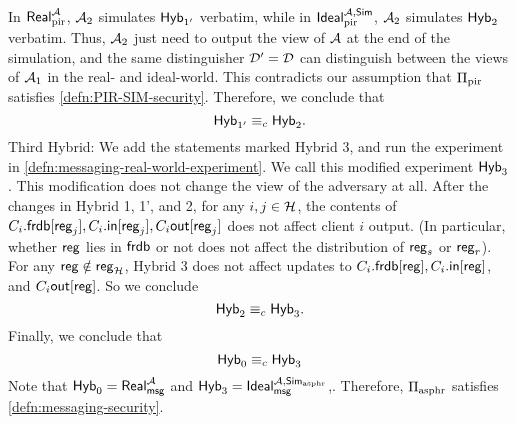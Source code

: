 In $\mathsf{Real}_{\text{pir}}^{\mathcal{A}}$, $\mathcal{A}_2$ simulates $\mathsf{Hyb}_{1'}$ verbatim, while in $\mathsf{Ideal}_{\text{pir}}^{\mathcal{A}, \mathsf{Sim}}$, $\mathcal{A}_2$ simulates $\mathsf{Hyb}_2$ verbatim. Thus, $\mathcal{A}_2$ just need to output the view of $\mathcal{A}$ at the end of the simulation, and the same distinguisher $\mathcal{D}' = \mathcal{D}$ can distinguish between the views of $\mathcal{A}_1$ in the real- and ideal-world. This contradicts our assumption that $\Pi_{\text{pir}}$ satisfies \cref{defn:PIR-SIM-security}. Therefore, we conclude that
$$\mathsf{Hyb}_{1'} \equiv_c \mathsf{Hyb}_2.$$
Third Hybrid: We add the statements marked Hybrid 3, and run the experiment in \cref{defn:messaging-real-world-experiment}. We call this modified experiment $\mathsf{Hyb}_{3}$. This modification does not change the view of the adversary at all. After the changes in Hybrid 1, 1', and 2, for any $i, j \in \mathcal{H}$, the contents of $C_i.\mathsf{frdb}[\mathsf{reg}_j], C_i.\mathsf{in}[\mathsf{reg}_j], C_i\mathsf{out}[\mathsf{reg}_j]$ does not affect client $i$ output. (In particular, whether $\mathsf{reg}$ lies in $\mathsf{frdb}$ or not does not affect the distribution of $\mathsf{reg}_s$ or $\mathsf{reg}_r$). For any $\mathsf{reg} \notin \mathsf{reg}_{\mathcal{H}}$, Hybrid 3 does not affect updates to $C_i.\mathsf{frdb}[\mathsf{reg}], C_i.\mathsf{in}[\mathsf{reg}]$, and $C_i\mathsf{out}[\mathsf{reg}]$. So we conclude
$$\mathsf{Hyb}_{2} \equiv_c \mathsf{Hyb}_3.$$
Finally, we conclude that
$$\mathsf{Hyb}_0 \equiv_c \mathsf{Hyb}_3$$
Note that $\mathsf{Hyb}_0 = \mathsf{Real}_{\mathsf{msg}}^{\mathcal{A}}$ and $\mathsf{Hyb}_3 = \mathsf{Ideal}_{\mathsf{msg}}^{\mathcal{A}, \mathsf{Sim}_{\text{asphr}}}$,. Therefore, $\Pi_{\text{asphr}}$ satisfies \cref{defn:messaging-security}.
